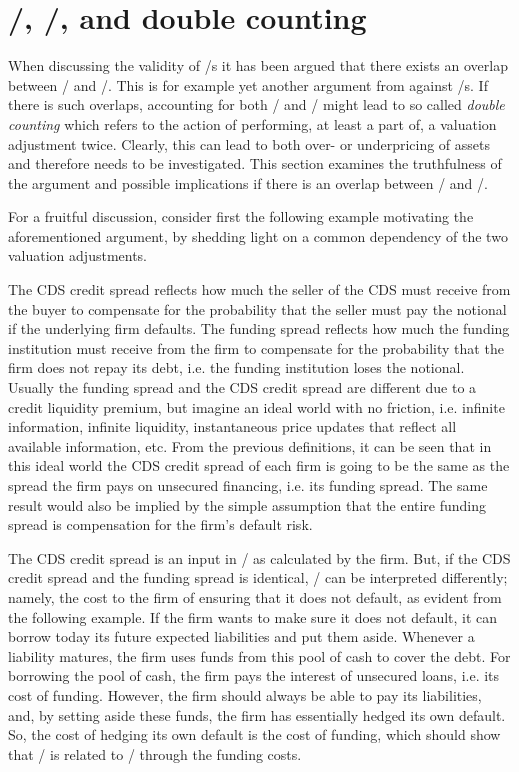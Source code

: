 \documentclass[main.tex]{subfiles}
\begin{document}
    \section{\FVA/, \DVA/, and double counting}
    \label{sec:fva-dva-double-counting}

    When discussing the validity of \FVA/s it has been argued
    that there exists an overlap between \FVA/ and \DVA/.
    This is for example yet another argument from \textcite{HullWhite2012FVA} against \FVA/s.
    If there is such overlaps, accounting for both \FVA/ and \DVA/
    might lead to so called \textit{double counting}
    which refers to the action of performing, at least a part of, a valuation adjustment twice. 
    Clearly, this can lead to both over- or underpricing of assets
    and therefore needs to be investigated.
    This section examines the truthfulness of the argument and possible implications 
    if there is an overlap between \FVA/ and \DVA/.

    For a fruitful discussion, 
    consider first the following example motivating the aforementioned argument,
    by shedding light on a common dependency of the two valuation adjustments.

    The CDS credit spread reflects how much the seller of the CDS must receive from the buyer
    to compensate for the probability that the seller must pay the notional 
    if the underlying firm defaults.
    The funding spread reflects how much the funding institution must receive from the firm 
    to compensate for the probability that the firm does not repay its debt, 
    i.e. the funding institution loses the notional.
    Usually the funding spread and the CDS credit spread 
    are different due to a credit liquidity premium,
    but imagine an ideal world with no friction, i.e. infinite information, infinite liquidity, 
    instantaneous price updates that reflect all available information, etc.
    From the previous definitions, it can be seen that in this ideal world
    the CDS credit spread of each firm is going to be the same 
    as the spread the firm pays on unsecured financing, i.e. its funding spread.
    The same result would also be implied by the simple assumption 
    that the entire funding spread is compensation for the firm's default risk.

    The CDS credit spread is an input in \DVA/ as calculated by the firm.
    But, if the CDS credit spread and the funding spread is identical, 
    \DVA/ can be interpreted differently;
    namely, the cost to the firm of ensuring that it does not default, 
    as evident from the following example.
    If the firm wants to make sure it does not default,
    it can borrow today its future expected liabilities and put them aside.
    Whenever a liability matures, the firm uses funds from this pool of cash to cover the debt.
    For borrowing the pool of cash, the firm pays the interest of unsecured loans, 
    i.e. its cost of funding.
    However, the firm should always be able to pay its liabilities,
    and, by setting aside these funds, the firm has essentially hedged its own default. 
    So, the cost of hedging its own default is the cost of funding, 
    which should show that \DVA/ is related to \FVA/ through the funding costs.
    
\end{document}

